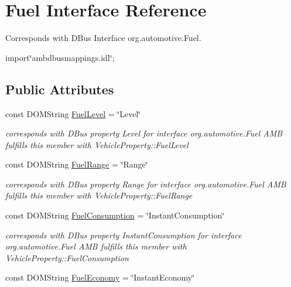 \hypertarget{interfaceFuel}{\section{Fuel Interface Reference}
\label{interfaceFuel}
}


Corresponds with D\+Bus Interface org.\+automotive.\+Fuel.  




{\ttfamily import\char`\"{}ambdbusmappings.\+idl\char`\"{};}

\subsection*{Public Attributes}
\begin{DoxyCompactItemize}
\item 
\hypertarget{interfaceFuel_a66d804618123a714025400d77e9e0a91}{const D\+O\+M\+String \hyperlink{interfaceFuel_a66d804618123a714025400d77e9e0a91}{Fuel\+Level} = \char`\"{}Level\char`\"{}}\label{interfaceFuel_a66d804618123a714025400d77e9e0a91}

\begin{DoxyCompactList}\small\item\em corresponds with D\+Bus property Level for interface org.\+automotive.\+Fuel A\+M\+B fulfills this member with Vehicle\+Property\+::\+Fuel\+Level \end{DoxyCompactList}\item 
\hypertarget{interfaceFuel_ad587a4868bd4a0bd757bcc816ecf9b8e}{const D\+O\+M\+String \hyperlink{interfaceFuel_ad587a4868bd4a0bd757bcc816ecf9b8e}{Fuel\+Range} = \char`\"{}Range\char`\"{}}\label{interfaceFuel_ad587a4868bd4a0bd757bcc816ecf9b8e}

\begin{DoxyCompactList}\small\item\em corresponds with D\+Bus property Range for interface org.\+automotive.\+Fuel A\+M\+B fulfills this member with Vehicle\+Property\+::\+Fuel\+Range \end{DoxyCompactList}\item 
\hypertarget{interfaceFuel_ab55c40fa9eac6d92afb34d12bafb155c}{const D\+O\+M\+String \hyperlink{interfaceFuel_ab55c40fa9eac6d92afb34d12bafb155c}{Fuel\+Consumption} = \char`\"{}Instant\+Consumption\char`\"{}}\label{interfaceFuel_ab55c40fa9eac6d92afb34d12bafb155c}

\begin{DoxyCompactList}\small\item\em corresponds with D\+Bus property Instant\+Consumption for interface org.\+automotive.\+Fuel A\+M\+B fulfills this member with Vehicle\+Property\+::\+Fuel\+Consumption \end{DoxyCompactList}\item 
\hypertarget{interfaceFuel_a2f89e032fc01b5350ff78ef92b35d869}{const D\+O\+M\+String \hyperlink{interfaceFuel_a2f89e032fc01b5350ff78ef92b35d869}{Fuel\+Economy} = \char`\"{}Instant\+Economy\char`\"{}}\label{interfaceFuel_a2f89e032fc01b5350ff78ef92b35d869}


\end{DoxyCompactItemize}
